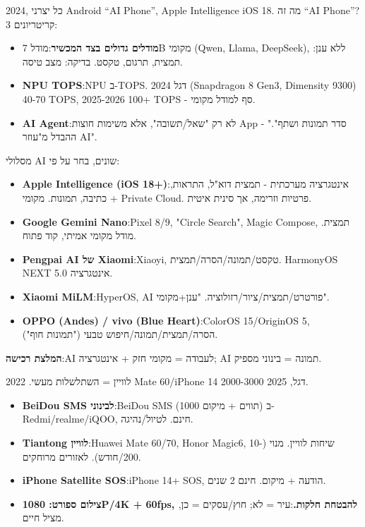 


2024, כל יצרני Android “AI Phone”, Apple Intelligence iOS 18. מה זה “AI Phone”? 3 קריטריונים:

\begin{itemize}
  \item \textbf{מודלים גדולים בצד המכשיר}:מודל 7B מקומי (Qwen, Llama, DeepSeek), ללא ענן: תמצית, תרגום, טקסט. בדיקה: מצב טיסה.
  \item \textbf{NPU TOPS}:NPU ב-TOPS. 2024 דגל (Snapdragon 8 Gen3, Dimensity 9300) 40-70 TOPS, 2025-2026 100+ TOPS - סף למודל מקומי.
  \item \textbf{AI Agent}:לא רק "שאל/תשובה", אלא משימות חוצות App - "סדר תמונות ושתף". ההבדל מ"עוזר AI".
\end{itemize}


מסלולי AI שונים, בחר על פי:

\begin{itemize}
  \item \textbf{Apple Intelligence (iOS 18+)}:אינטגרציה מערכתית - תמצית דוא"ל, התראות, כתיבה, תמונות. מקומי + Private Cloud. פרטיות וזרימה, אך סינית איטית.
  \item \textbf{Google Gemini Nano}:Pixel 8/9, "Circle Search", Magic Compose, תמצית. מודל מקומי אמיתי, קוד פתוח.
  \item \textbf{Pengpai AI של Xiaomi}:Xiaoyi, טקסט/תמונה/הסרה/תמצית. HarmonyOS NEXT 5.0 אינטגרציה.
  \item \textbf{Xiaomi MiLM}:HyperOS, AI פורטרט/תמצית/ציור/רזולוציה. "ענן+מקומי".
  \item \textbf{OPPO (Andes) / vivo (Blue Heart)}:ColorOS 15/OriginOS 5, הסרה/תמצית/תמונה/חיפוש טבעי ("תמונות חוף").
\end{itemize}

\textbf{המלצת רכישה}:AI לעבודה = מקומי חזק + אינטגרציה; AI תמונה = בינוני מספיק.


לוויין = השתלשלות מעשי. 2022 Mate 60/iPhone 14 דגל, 2025 2000-3000.

\begin{itemize}
  \item \textbf{BeiDou SMS לבינוני}:BeiDou SMS (1000 תווים + מיקום) ב-Redmi/realme/iQOO, חינם. לטיול/נהיגה.
  \item \textbf{Tiantong לוויין}:Huawei Mate 60/70, Honor Magic6, שיחות לוויין. מנוי (10-200/חודש). לאזורים מרוחקים.
  \item \textbf{iPhone Satellite SOS}:iPhone 14+ SOS, הודעה + מיקום. חינם 2 שנים.
  \item \textbf{צילום ספורט: 1080P/4K + 60fps, להבטחת חלקות.}:עיר = לא; חוץ/עסקים = כן, מציל חיים.
\end{itemize}

